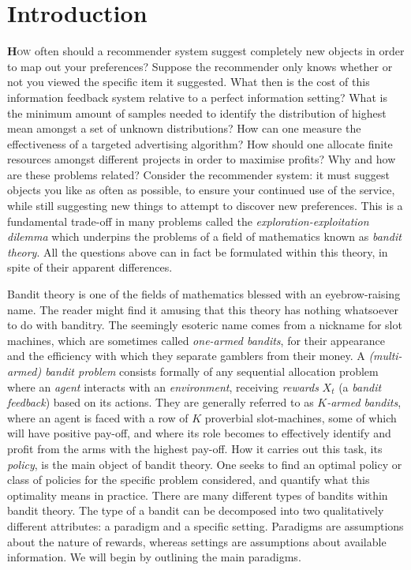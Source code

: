\chapter*{Introduction}
\lettrine[lines=4]{\textcolor{dropcap}{\textbf{H}}}{ow} often should a recommender system suggest completely new objects in order to map out your preferences? Suppose the recommender only knows whether or not you viewed the specific item it suggested. What then is the cost of this information feedback system relative to a perfect information setting? What is the minimum amount of samples needed to identify the distribution of highest mean amongst a set of unknown distributions? How can one measure the effectiveness of a targeted advertising algorithm? How should one allocate finite resources amongst different projects in order to maximise profits?  Why and how are these problems related? Consider the recommender system: it must suggest objects you like as often as possible, to ensure your continued use of the service, while still suggesting new things to attempt to discover new preferences. This is a fundamental trade-off in many problems called the {\em exploration-exploitation dilemma} which underpins the problems of a field of mathematics known as {\em bandit theory}. All the questions above can in fact be formulated within this theory, in spite of their apparent differences. 

\par Bandit theory is one of the fields of mathematics blessed with an eyebrow-raising name. The reader might find it amusing that this theory has nothing whatsoever to do with banditry.  The seemingly esoteric name comes from a nickname for slot machines, which are sometimes called {\em one-armed bandits}, for their appearance and the efficiency with which they separate gamblers from their money. A {\em (multi-armed) bandit problem} consists formally of any sequential allocation problem where an {\em agent} interacts with an {\em environment}, receiving {\em rewards} $X_t$ (a {\em bandit feedback}) based on its actions. They are generally referred to as {\em $K$-armed bandits}, where an agent is faced with a row of $K$ proverbial slot-machines, some of which will have positive pay-off, and where its role becomes to effectively identify and profit from the arms with the highest pay-off. How it carries out this task, its {\em policy}, is the main object of bandit theory. One seeks to find an optimal policy or class of policies for the specific problem considered, and quantify what this optimality means in practice. There are many different types of bandits within bandit theory. The type of a bandit can be decomposed into two qualitatively different attributes: a paradigm and a specific setting. Paradigms are assumptions about the nature of rewards, whereas settings are assumptions about available information. We will begin by outlining the main paradigms. 

